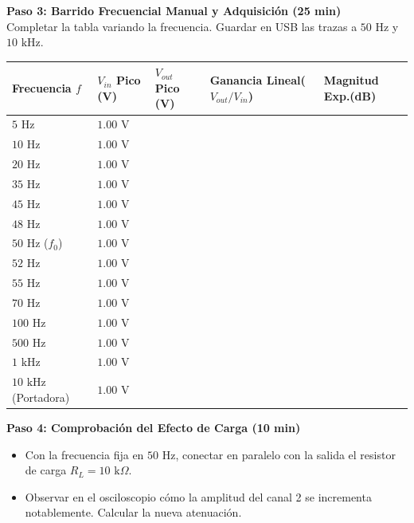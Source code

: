 \documentclass[11pt,a4paper,twoside]{article}
\begin{document}
\textbf{Paso 3: Barrido Frecuencial Manual y Adquisición (25 min)}\\
Completar la tabla variando la frecuencia. Guardar en USB las trazas a $50\text{ Hz}$ y $10\text{ kHz}$.

\begin{table}[ht!]
    \centering
    \small
    \renewcommand{\arraystretch}{1.2}
    \begin{tabularx}{\textwidth}{|>{\centering\arraybackslash}p{2.5cm}|>{\centering\arraybackslash}X|>{\centering\arraybackslash}X|>{\centering\arraybackslash}X|>{\centering\arraybackslash}X|}
        \hline
        \textbf{Frecuencia $f$} & \textbf{$V_{in}$ Pico (V)} & \textbf{$V_{out}$ Pico (V)} & \textbf{Ganancia Lineal\newline ($V_{out}/V_{in}$)} & \textbf{Magnitud Exp.\newline (dB)} \\
        \hline
        $5\text{ Hz}$ & $1.00\text{ V}$ & & & \\
        $10\text{ Hz}$ & $1.00\text{ V}$ & & & \\
        $20\text{ Hz}$ & $1.00\text{ V}$ & & & \\
        $35\text{ Hz}$ & $1.00\text{ V}$ & & & \\
        $45\text{ Hz}$ & $1.00\text{ V}$ & & & \\
        $48\text{ Hz}$ & $1.00\text{ V}$ & & & \\
        $50\text{ Hz}$ ($f_0$) & $1.00\text{ V}$ & & & \\
        $52\text{ Hz}$ & $1.00\text{ V}$ & & & \\
        $55\text{ Hz}$ & $1.00\text{ V}$ & & & \\
        $70\text{ Hz}$ & $1.00\text{ V}$ & & & \\
        $100\text{ Hz}$ & $1.00\text{ V}$ & & & \\
        $500\text{ Hz}$ & $1.00\text{ V}$ & & & \\
        $1\text{ kHz}$ & $1.00\text{ V}$ & & & \\
        $10\text{ kHz}$ (Portadora) & $1.00\text{ V}$ & & & \\
        \hline
    \end{tabularx}
\end{table}

\vspace{0.3cm}
\textbf{Paso 4: Comprobación del Efecto de Carga (10 min)}
\begin{itemize}
    \item Con la frecuencia fija en $50\text{ Hz}$, conectar en paralelo con la salida el resistor de carga $R_L = 10\text{ k}\Omega$.
    \item Observar en el osciloscopio cómo la amplitud del canal 2 se incrementa notablemente. Calcular la nueva atenuación.
\end{itemize}
\end{document}
